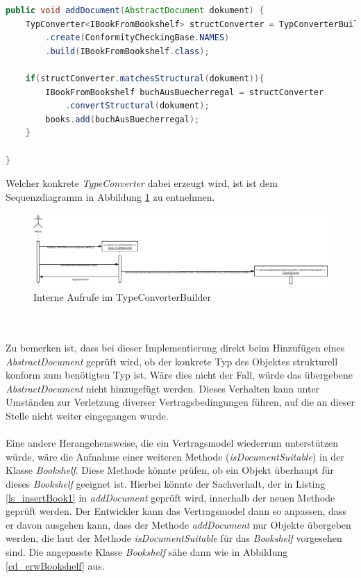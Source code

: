 \documentclass[11pt, 
ngerman,
doublespacing,
chapterinoneline, %
consistentlayout, %
]{scrartcl}
\begin{document}
\begin{lstlisting}[language=Java, label=ls_insertBook1, caption=addDocument]
public void addDocument(AbstractDocument dokument) {
	TypConverter<IBookFromBookshelf> structConverter = TypConverterBuilder
		.create(ConformityCheckingBase.NAMES)
		.build(IBookFromBookshelf.class);

	if(structConverter.matchesStructural(dokument)){
		IBookFromBookshelf buchAusBuecherregal = structConverter
			.convertStructural(dokument);
		books.add(buchAusBuecherregal);
	}	
	
}
\end{lstlisting}
Welcher konkrete \emph{TypeConverter} dabei erzeugt wird, ist ist dem Sequenzdiagramm in Abbildung \ref{sd_typeconverterbuilder} zu entnehmen.
\begin{figure}[h]
\centering
\includegraphics[scale=0.25]{pics/sd_createSignatureTypeConverter.png}
\caption{Interne Aufrufe im TypeConverterBuilder}
\label{sd_typeconverterbuilder}
\end{figure}\\\\
Zu bemerken ist, dass bei dieser Implementierung direkt beim Hinzufügen eines \emph{AbstractDocument} geprüft wird, ob der konkrete Typ des Objektes strukturell konform zum benötigten Typ ist. Wäre dies nicht der Fall, würde das übergebene \emph{AbstractDocument} nicht hinzugefügt werden. Dieses Verhalten kann unter Umständen zur Verletzung diverser Vertragsbedingungen führen, auf die an dieser Stelle nicht weiter eingegangen wurde.\\\\
Eine andere Herangehensweise, die ein Vertragsmodel wiederrum unterstützen würde, wäre die Aufnahme einer weiteren Methode (\emph{isDocumentSuitable}) in der Klasse \emph{Bookshelf}. Diese Methode könnte prüfen, ob ein Objekt überhaupt für dieses \emph{Bookshelf} geeignet ist. Hierbei könnte der Sachverhalt, der in Listing \ref{ls_insertBook1} in \emph{addDocument} geprüft wird, innerhalb der neuen Methode geprüft werden. Der Entwickler kann das Vertragsmodel dann so anpassen, dass er davon ausgehen kann, dass der Methode \emph{addDocument} nur Objekte übergeben werden, die laut der Methode \emph{isDocumentSuitable} für das \emph{Bookshelf} vorgesehen sind. Die angepasste Klasse \emph{Bookshelf} sähe dann wie in Abbildung \ref{cd_erwBookshelf} aus.
\end{document}
